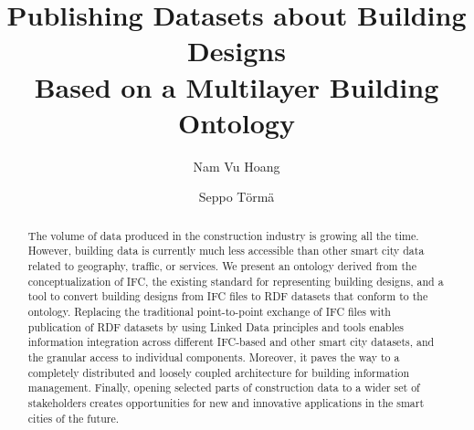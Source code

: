 \documentclass[envcountsame]{llncs}
\begin{document}
%
\frontmatter          %
%
\pagestyle{headings}  %
%


%
\title{Publishing Datasets about Building Designs \\Based on a Multilayer Building Ontology}
%
%
\author{Nam Vu Hoang \and Seppo T\"orm\"a}
%
%

\maketitle              %

\begin{abstract}

The volume of data produced in the construction industry is growing all the time. However, building data is currently much less accessible than other smart city data related to geography, traffic, or services. We present an ontology derived from the conceptualization of IFC, the existing standard for representing building designs, and a tool to convert building designs from IFC files to RDF datasets that conform to the ontology. Replacing the traditional point-to-point exchange of IFC files with publication of RDF datasets  by using Linked Data principles and tools enables information integration across different IFC-based and other smart city datasets, and the granular access to individual components. Moreover, it paves the way to a completely distributed and loosely coupled architecture for building information management. Finally, opening selected parts of construction data to a wider set of stakeholders creates opportunities for new and innovative applications in the smart cities of the future.


\end{abstract}









\clearpage
{} %
\renewcommand{\indexname}{Author Index}
\printindex
\clearpage
{} %
\renewcommand{\indexname}{Subject Index}
% 
\end{document}
